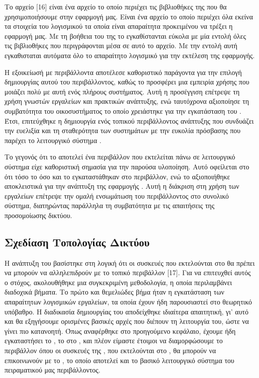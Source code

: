Το αρχείο [16] είναι ένα αρχείο το οποίο περιέχει τις βιβλιοθήκες της  που θα χρησιμοποιήσουμε στην εφαρμογή μας. Είναι ένα  αρχείο το οποίο περιέχει όλα εκείνα τα στοιχεία του λογισμικού τα οποία είναι απαραίτητα προκειμένου να τρέξει η εφαρμογή μας. Με τη βοήθεια του  της  το  εγκαθίστανται εύκολα με μία εντολή όλες τις βιβλιοθήκες που περιγράφονται μέσα σε αυτό το  αρχείο. Με την εντολή αυτή  εγκαθισταται αυτόματα όλο το απαραίτητο λογισμικό για την εκτέλεση της εφαρμογής.

Η εξοικείωσή με περιβάλλοντα  αποτέλεσε καθοριστικό παράγοντα
για την επιλογή δημιουργίας αυτού του περιβάλλοντος, καθώς το  προσφέρει μια 
εμπειρία χρήσης που μοιάζει πολύ με αυτή ενός πλήρους  
συστήματος. Αυτή η προσέγγιση επέτρεψε τη χρήση γνωστών εργαλείων και 
πρακτικών ανάπτυξης, ενώ ταυτόχρονα αξιοποίησε τη συμβατότητα του  
οικοσυστήματος το οποίο χρειάστηκε για την εγκατάσταση του . Έτσι, επιτεύχθηκε η δημιουργία ενός τοπικού περιβάλλοντος 
ανάπτυξης που συνδυάζει την ευελιξία και τη σταθερότητα των  
συστημάτων με την ευκολία πρόσβασης που παρέχει το λειτουργικό σύστημα .

Το γεγονός ότι το  αποτελεί ένα  περιβάλλον που εκτελείται πάνω σε λειτουργικό σύστημα  είχε καθοριστική σημασία για την παρούσα υλοποίηση. Αυτό οφείλεται στο ότι τόσο το  όσο και το  εγκαταστάθηκαν στο  περιβάλλον, ενώ το  αξιοποιήθηκε αποκλειστικά για την ανάπτυξη της εφαρμογής . Αυτή η διάκριση στη χρήση των εργαλείων επέτρεψε την ομαλή ενσωμάτωση του  περιβάλλοντος στο συνολικό σύστημα, διατηρώντας παράλληλα τη συμβατότητα με τις απαιτήσεις της προσομοίωσης δικτύου.

\subsection{Σχεδίαση Τοπολογίας Δικτύου}

Η ανάπτυξη του  βασίστηκε στη λογική ότι οι συσκευές που εκτελούνται στο  θα πρέπει να μπορούν να αλληλεπιδρούν με το τοπικό περιβάλλον [17]. Για να επιτευχθεί αυτός ο στόχος, ακολουθήθηκε μια συγκεκριμένη μεθοδολογία, η οποία περιλαμβάνει διαδοχικά βήματα.
Το πρώτο και θεμελιώδες βήμα ήταν η εγκατάσταση των απαραίτητων λογισμικών εργαλείων, τα οποία έχουν ήδη παρουσιαστεί στο θεωρητικό υπόβαθρο. Η διαδικασία δημιουργίας του  αποδείχθηκε ιδιαίτερα απαιτητική, γι' αυτό και θα εξηγήσουμε ορισμένες βασικές αρχές που διέπουν τη λειτουργία του, ώστε να γίνει πιο κατανοητή.
Όπως αναφέρθηκε στο προηγούμενο κεφάλαιο, έχουμε ήδη εγκαταστήσει το , το  στο , και πλέον είμαστε έτοιμοι να διαμορφώσουμε το περιβάλλον όπου οι συσκευές της , που εκτελούνται στο , θα μπορούν να επικοινωνούν με το , το οποίο αποτελεί και το βασικό λειτουργικό σύστημα του πειραματικού μας περιβάλλοντος.


